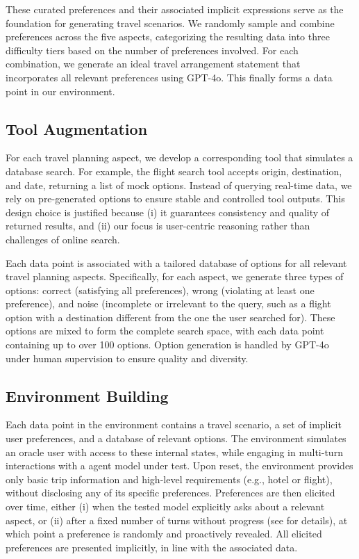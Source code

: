 These curated preferences and their associated implicit expressions serve as the foundation for generating travel scenarios. We randomly sample and combine preferences across the five aspects, categorizing the resulting data into three difficulty tiers based on the number of preferences involved. For each combination, we generate an ideal travel arrangement statement that incorporates all relevant preferences using GPT-4o. This finally forms a data point in our environment.

\subsection{Tool Augmentation}
For each travel planning aspect, we develop a corresponding tool that simulates a database search. For example, the flight search tool accepts origin, destination, and date, returning a list of mock options. Instead of querying real-time data, we rely on pre-generated options to ensure stable and controlled tool outputs. This design choice is justified because (i) it guarantees consistency and quality of returned results, and (ii) our focus is user-centric reasoning rather than challenges of online search.

Each data point is associated with a tailored database of options for all relevant travel planning aspects. Specifically, for each aspect, we generate three types of options: correct (satisfying all preferences), wrong (violating at least one preference), and noise (incomplete or irrelevant to the query, such as a flight option with a destination different from the one the user searched for). These options are mixed to form the complete search space, with each data point containing up to over 100 options. Option generation is handled by GPT-4o under human supervision to ensure quality and diversity.

\subsection{Environment Building}
Each data point in the environment contains a travel scenario, a set of implicit user preferences, and a database of relevant options. The environment simulates an oracle user with access to these internal states, while engaging in multi-turn interactions with a agent model under test. Upon reset, the environment provides only basic trip information and high-level requirements (e.g., hotel or flight), without disclosing any of its specific preferences. Preferences are then elicited over time, either (i) when the tested model explicitly asks about a relevant aspect, or (ii) after a fixed number of turns without progress (see  for details), at which point a preference is randomly and proactively revealed. All elicited preferences are presented implicitly, in line with the associated data.

